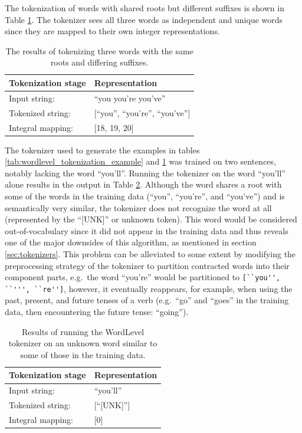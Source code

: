 \documentclass[12pt]{article}
\begin{document}
The tokenization of words with shared roots but different suffixes is shown in Table \ref{tab:wordlevel_tokenization_shared_roots_example}. The tokenizer sees all three words as independent and unique words since they are mapped to their own integer representations.

\begin{table}[!t]
    \centering
    \begin{tabular}{l l}
        \toprule
        Tokenization stage & Representation                    \\
        \midrule
        Input string:      & ``you you're you've''             \\
        Tokenized string:  & [``you'', ``you're'', ``you've''] \\
        Integral mapping:  & [18, 19, 20]                      \\
        \bottomrule
    \end{tabular}
    \caption{The results of tokenizing three words with the same roots and differing suffixes.}
    \label{tab:wordlevel_tokenization_shared_roots_example}
\end{table}

The tokenizer used to generate the examples in tables \ref{tab:wordlevel_tokenization_example} and \ref{tab:wordlevel_tokenization_shared_roots_example} was trained on two sentences, notably lacking the word ``you'll''. Running the tokenizer on the word ``you'll'' alone results in the output in Table \ref{tab:wordlevel_unk_word}. Although the word shares a root with some of the words in the training data (``you'', ``you're'', and ``you've'') and is semantically very similar, the tokenizer does not recognize the word at all (represented by the ``[UNK]'' or unknown token). This word would be considered out-of-vocabulary since it did not appear in the training data and thus reveals one of the major downsides of this algorithm, as mentioned in section \ref{sec:tokenizers}. This problem can be alleviated to some extent by modifying the preprocessing strategy of the tokenizer to partition contracted words into their component parts, e.g.~the word ``you're'' would be partitioned to \lstinline|[``you'', ``''', ``re'']|, however, it eventually reappears, for example, when using the past, present, and future tenses of a verb (e.g.~``go'' and ``goes'' in the training data, then encountering the future tense: ``going'').

\begin{table}[!t]
    \centering
    \begin{tabular}{l l}
        \toprule
        Tokenization stage & Representation \\
        \midrule
        Input string:      & ``you'll''     \\
        Tokenized string:  & [``[UNK]'']    \\
        Integral mapping:  & [0]            \\
        \bottomrule
    \end{tabular}
    \caption{Results of running the WordLevel tokenizer on an unknown word similar to some of those in the training data.}
    \label{tab:wordlevel_unk_word}
\end{table}
\end{document}

